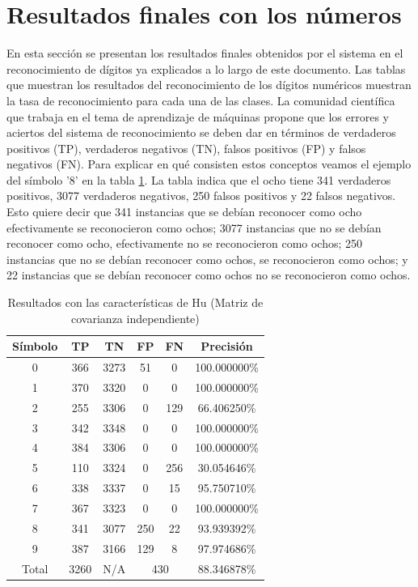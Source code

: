 \documentclass[a4paper, 11pt, oneside]{report}
\begin{document}
\section{Resultados finales con los números}
En esta sección se presentan los resultados finales obtenidos por el sistema en el reconocimiento de dígitos ya explicados a lo largo de este documento. Las tablas que muestran los resultados del reconocimiento de los dígitos numéricos muestran la tasa de reconocimiento para cada una de las clases. La comunidad científica que trabaja en el tema de aprendizaje de máquinas propone que los errores y aciertos del sistema de reconocimiento se deben dar en términos de verdaderos positivos (TP), verdaderos negativos (TN), falsos positivos (FP) y falsos negativos (FN). Para explicar en qué consisten estos conceptos veamos el ejemplo del símbolo '8' en la tabla \ref{tb:numHuIndep}. La tabla indica que el ocho tiene 341 verdaderos positivos, 3077 verdaderos negativos, 250 falsos positivos y 22 falsos negativos. Esto quiere decir que 341 instancias que se debían reconocer como ocho efectivamente se reconocieron como ochos; 3077 instancias que no se debían reconocer como ocho, efectivamente no se reconocieron como ochos; 250 instancias que no se debían reconocer como ochos, se reconocieron como ochos; y 22 instancias que se debían reconocer como ochos no se reconocieron como ochos.
\begin{table}
\centering
\begin{tabular}{|c|c|c|c|c|c|}
\hline
Símbolo & TP & TN & FP & FN & Precisión \\ 
\hline
0 & 366 & 3273 & 51 & 0 & 100.000000\% \\ 
1 & 370 & 3320 & 0 & 0 & 100.000000\% \\ 
2 & 255 & 3306 & 0 & 129 & 66.406250\% \\ 
3 & 342 & 3348 & 0 & 0 & 100.000000\% \\ 
4 & 384 & 3306 & 0 & 0 & 100.000000\% \\ 
5 & 110 & 3324 & 0 & 256 & 30.054646\% \\ 
6 & 338 & 3337 & 0 & 15 & 95.750710\% \\ 
7 & 367 & 3323 & 0 & 0 & 100.000000\% \\ 
8 & 341 & 3077 & 250 & 22 & 93.939392\% \\ 
9 & 387 & 3166 & 129 & 8 & 97.974686\% \\ 
\hline
Total & 3260 & N/A & \multicolumn{2}{|c|}{430} & 88.346878\% \\
\hline
\end{tabular}
\caption{Resultados con las características de Hu (Matriz de covarianza independiente)}
\label{tb:numHuIndep}
\end{table}
\end{document}

